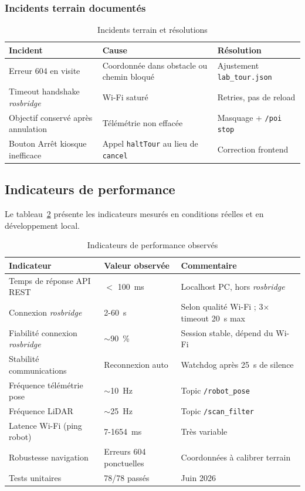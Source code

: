 \subsubsection{Incidents terrain documentés}

\begin{table}[H]
\centering
\caption{Incidents terrain et résolutions}
\label{tab:incidents}
\small
\begin{tabular}{|p{2.8cm}|p{3.8cm}|p{4.2cm}|}
\hline
\textbf{Incident} & \textbf{Cause} & \textbf{Résolution} \\
\hline
Erreur 604 en visite & Coordonnée dans obstacle ou chemin bloqué & Ajustement \texttt{lab\_tour.json} \\
\hline
Timeout handshake \textit{rosbridge} & Wi-Fi saturé & Retries, pas de reload \\
\hline
Objectif conservé après annulation & Télémétrie non effacée & Masquage + \texttt{/poi stop} \\
\hline
Bouton Arrêt kiosque inefficace & Appel \texttt{haltTour} au lieu de \texttt{cancel} & Correction frontend \\
\hline
\end{tabular}
\end{table}

\newpage
\subsection{Indicateurs de performance}

Le tableau~\ref{tab:perf} présente les indicateurs mesurés en conditions réelles
et en développement local.

\begin{table}[H]
\centering
\caption{Indicateurs de performance observés}
\label{tab:perf}
\begin{tabular}{|p{4cm}|p{3cm}|p{4cm}|}
\hline
\textbf{Indicateur} & \textbf{Valeur observée} & \textbf{Commentaire} \\
\hline
Temps de réponse API REST & $<$ 100~ms & Localhost PC, hors \textit{rosbridge} \\
\hline
Connexion \textit{rosbridge} & 2-60~s & Selon qualité Wi-Fi ; 3$\times$ timeout 20~s max \\
\hline
Fiabilité connexion \textit{rosbridge} & $\sim$90~\% & Session stable, dépend du Wi-Fi \\
\hline
Stabilité communications & Reconnexion auto & Watchdog après 25~s de silence \\
\hline
Fréquence télémétrie pose & $\sim$10~Hz & Topic \texttt{/robot\_pose} \\
\hline
Fréquence LiDAR & $\sim$25~Hz & Topic \texttt{/scan\_filter} \\
\hline
Latence Wi-Fi (ping robot) & 7-1654~ms & Très variable \\
\hline
Robustesse navigation & Erreurs 604 ponctuelles & Coordonnées à calibrer terrain \\
\hline
Tests unitaires & 78/78 passés & Juin 2026 \\
\hline
\end{tabular}
\end{table}


